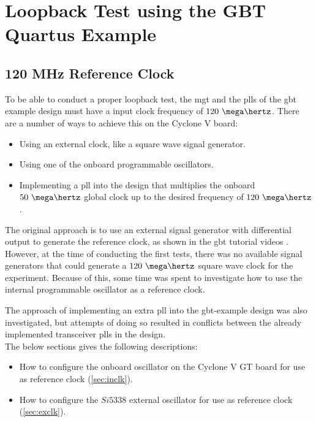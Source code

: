 \documentclass[main.tex]{subfiles}
\begin{document}
\chapter{Loopback Test using the GBT Quartus Example}

\section{120 MHz Reference Clock}


To be able to conduct a proper loopback test, the \gls{mgt} and the \glspl{pll} of the \gls{gbt} example design must have a input clock frequency of $120~\mega\hertz$. There are a number of ways to achieve this on the Cyclone V board: 
\begin{itemize}\setlength{\itemsep}{10pt}
\item Using an external clock, like a square wave signal generator.
\item Using one of the onboard programmable oscillators.
\item Implementing a \gls{pll} into the design that multiplies the onboard $50~\mega\hertz$ global clock up to the desired frequency of $120~\mega\hertz$.\\
\end{itemize}

The original approach is to use an external signal generator with differential output to generate the reference clock, as shown in the \gls{gbt} tutorial videos \cite{gbt_videos}. However, at the time of conducting the first tests, there was no available signal generators that could generate a $120~\mega\hertz$ square wave clock for the experiment. Because of this, some time was spent to investigate how to use the internal programmable oscillator as a reference clock.

The approach of implementing an extra \gls{pll} into the \gls{gbt}-example design was also investigated, but attempts of doing so resulted in conflicts between the already implemented transceiver \glspl{pll} in the design. \\

The below sections gives the following descriptions:
\begin{itemize}\setlength{\itemsep}{10pt}
\item How to configure the onboard oscillator on the Cyclone V GT board for use as reference clock (\ref{sec:inclk}). 
\item How to configure the $Si5338$ external oscillator for use as reference clock (\ref{sec:exclk}).
\end{itemize}
\end{document}
